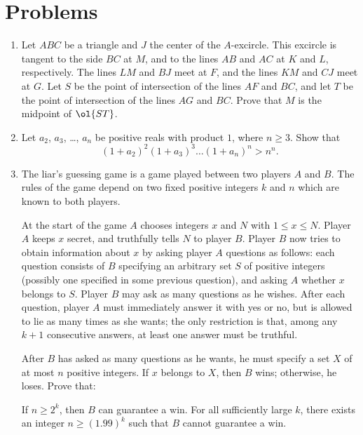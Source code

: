 \documentclass[11pt]{scrartcl}
\begin{document}
\section{Problems}
\begin{enumerate}[\bfseries 1.]
\item %
Let $ABC$ be a triangle and $J$ the center of the $A$-excircle.
This excircle is tangent to the side $BC$ at $M$,
and to the lines $AB$ and $AC$ at $K$ and $L$, respectively.
The lines $LM$ and $BJ$ meet at $F$, and the lines $KM$ and $CJ$ meet at $G$.
Let $S$ be the point of intersection of the lines $AF$ and $BC$,
and let $T$ be the point of intersection of the lines $AG$ and $BC$.
Prove that $M$ is the midpoint of $\ol{ST}$.

\item %
Let $a_2$, $a_3$, \dots, $a_n$ be positive reals with product $1$,
where $n \ge 3$.
Show that
\[ (1+a_2)^2 (1+a_3)^3 \dots (1+a_n)^n > n^n. \]

\item %
The liar's guessing game is a game played between two players $A$ and $B$.
The rules of the game depend on two fixed positive integers $k$ and $n$
which are known to both players.

At the start of the game $A$
chooses integers $x$ and $N$ with $1 \le x \le N$.
Player $A$ keeps $x$ secret, and truthfully tells $N$ to player $B$.
Player $B$ now tries to obtain information about $x$
by asking player $A$ questions as follows:
each question consists of $B$ specifying an arbitrary set $S$
of positive integers (possibly one specified in some previous question),
and asking $A$ whether $x$ belongs to $S$.
Player $B$ may ask as many questions as he wishes.
After each question, player $A$ must immediately answer
it with yes or no, but is allowed to lie as many times as she wants;
the only restriction is that, among any $k+1$ consecutive answers,
at least one answer must be truthful.

After $B$ has asked as many questions as he wants,
he must specify a set $X$ of at most $n$ positive integers.
If $x$ belongs to $X$, then $B$ wins;
otherwise, he loses.
Prove that:

\begin{enumerate}[(a)]
  \ii If $n \ge 2^k$, then $B$ can guarantee a win.
  \ii For all sufficiently large $k$,
  there exists an integer $n \ge (1.99)^k$
  such that $B$ cannot guarantee a win.
\end{enumerate}


\end{enumerate}
\end{document}
